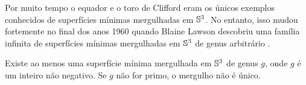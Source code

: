 




Por muito tempo o equador e o toro de Clifford eram os únicos exemplos conhecidos de superfícies mínimas mergulhadas em $\mathbb{S}^3$. No entanto, isso mudou fortemente no final dos anos 1960 quando Blaine Lawson descobriu uma família infinita de superfícies mínimas mergulhadas em $\mathbb{S}^3$ de genus arbitrário \cite{Lawson1970a}.

\begin{teorema}[Lawson]
	Existe ao menos uma superfície mínima mergulhada em $\mathbb{S}^3$ de genus $g$, onde $g$ é um inteiro não negativo. Se $g$ não for primo, o mergulho não é único.
\end{teorema}




